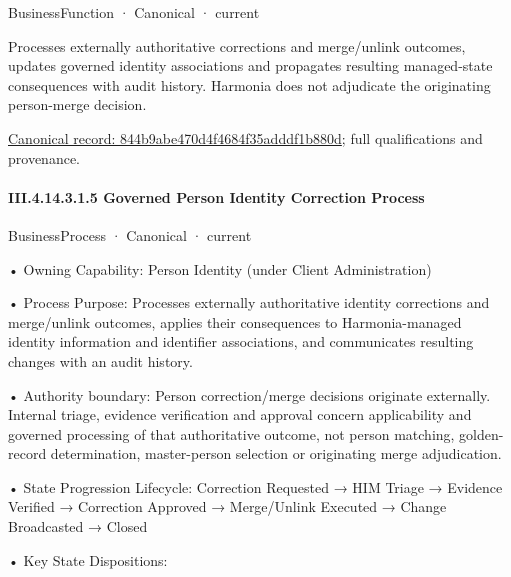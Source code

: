 \label{element:844b9abe470d4f4684f35adddf1b880d}
{\small BusinessFunction · Canonical · current}\par

Processes externally authoritative corrections and merge/unlink outcomes, updates governed identity associations and propagates resulting managed-state consequences with audit history. Harmonia does not adjudicate the originating person-merge decision.


{\footnotesize \href{../../../../../../../../continuum/business/business-function/844b9abe470d4f4684f35adddf1b880d.md}{Canonical record: 844b9abe470d4f4684f35adddf1b880d}; full qualifications and provenance.}\par
\paragraph*{III.4.14.3.1.5 Governed Person Identity Correction Process}
\label{navigation:III.4.14.3.1.5}

\label{element:72f3c63da45d44868579a3bb15d1568c}
{\small BusinessProcess · Canonical · current}\par

•
Owning Capability: Person Identity (under Client Administration)



•
Process Purpose: Processes externally authoritative identity corrections and merge/unlink outcomes, applies their consequences to Harmonia-managed identity information and identifier associations, and communicates resulting changes with an audit history.



•
Authority boundary: Person correction/merge decisions originate externally. Internal triage, evidence verification and approval concern applicability and governed processing of that authoritative outcome, not person matching, golden-record determination, master-person selection or originating merge adjudication.



•
State Progression Lifecycle: Correction Requested → HIM Triage → Evidence Verified → Correction Approved → Merge/Unlink Executed → Change Broadcasted → Closed



•
Key State Dispositions:



